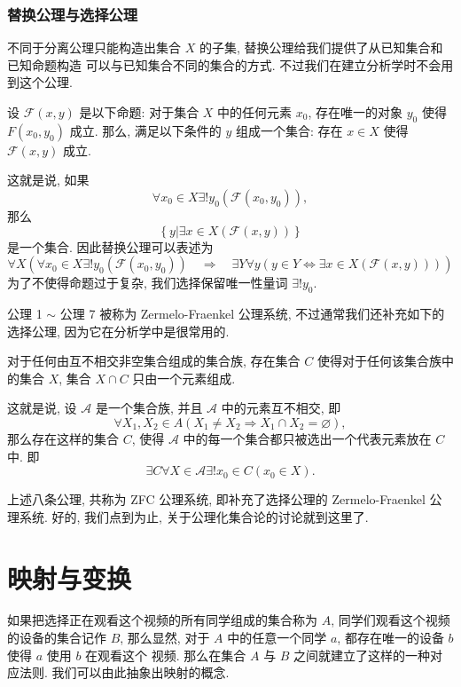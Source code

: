 \documentclass[10pt,UTF8]{book} %
\begin{document}
\subsubsection{替换公理与选择公理}

不同于分离公理只能构造出集合 $X$ 的子集, 替换公理给我们提供了从已知集合和已知命题构造
可以与已知集合不同的集合的方式. 不过我们在建立分析学时不会用到这个公理.

\begin{axiom}[替换公理]
    设 $\mathcal{F}(x,y)$ 是以下命题: 对于集合 $X$ 中的任何元素 $x_0$, 存在唯一的对象
    $y_0$ 使得 $F(x_0, y_0)$ 成立. 那么, 满足以下条件的 $y$ 组成一个集合:
    存在 $x \in X$ 使得 $\mathcal{F}(x,y)$ 成立.
\end{axiom}

这就是说, 如果
\[ \forall x_0 \in X \exists ! y_0  (\mathcal{F}(x_0, y_0)) ,\]
那么
\[ \left\{ y | \exists x \in X  (\mathcal{F}(x,y))  \right\} \]
是一个集合. 因此替换公理可以表述为
\[ \forall X \left( 
    \forall x_0 \in X\exists ! y_0 (\mathcal{F}(x_0, y_0))
    \quad \Longrightarrow \quad 
    \exists Y \forall y \left(  y \in Y \Leftrightarrow
    \exists x \in X (\mathcal{F}(x,y)) \right)
\right) \]
为了不使得命题过于复杂, 我们选择保留唯一性量词 $\exists ! y_0$.

公理 1 $\sim$ 公理 7 被称为 Zermelo-Fraenkel 公理系统,
不过通常我们还补充如下的选择公理, 因为它在分析学中是很常用的.

\begin{axiom}[选择公理]
    对于任何由互不相交非空集合组成的集合族, 存在集合 $C$ 使得对于任何该集合族中的集合 $X$,
    集合 $X \cap C$ 只由一个元素组成.
\end{axiom}

这就是说, 设 $\mathscr{A}$ 是一个集合族, 并且 $\mathscr{A}$ 中的元素互不相交, 即 
\[ \forall X_1, X_2 \in A \left(
    X_1 \ne X_2 \Rightarrow X_1 \cap X_2 = \varnothing
\right), \]
那么存在这样的集合 $C$, 使得 $\mathscr{A}$ 中的每一个集合都只被选出一个代表元素放在
$C$ 中. 即
\[ \exists C \forall X \in \mathscr{A} \exists! x_0 \in C \left(
    x_0 \in X
\right). \]

上述八条公理, 共称为 ZFC 公理系统, 即补充了选择公理的 Zermelo-Fraenkel 公理系统.
好的, 我们点到为止, 关于公理化集合论的讨论就到这里了.

\section{映射与变换}

如果把选择正在观看这个视频的所有同学组成的集合称为 $A$, 同学们观看这个视频的设备的集合记作 $B$,
那么显然, 对于 $A$ 中的任意一个同学 $a$, 都存在唯一的设备 $b$ 使得 $a$ 使用 $b$ 在观看这个
视频. 那么在集合 $A$ 与 $B$ 之间就建立了这样的一种对应法则. 我们可以由此抽象出映射的概念.
\end{document}
